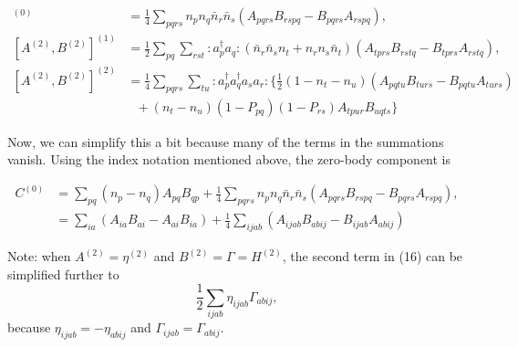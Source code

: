 \documentclass[12pt]{article}
\begin{document}
\begin{align}
[A^{(2)},B^{(2)}]^{(0)} &= \frac{1}{4} \sum_{pqrs} n_pn_q\bar{n}_r \bar{n}_s (A_{pqrs}B_{rspq}-B_{pqrs}A_{rspq}),\\
[A^{(2)},B^{(2)}]^{(1)} &= \frac{1}{2} \sum_{pq}\sum_{rst} :a_p^\dagger a_q: (\bar{n}_r \bar{n}_s n_t + n_r n_s \bar{n}_t) (A_{tprs}B_{rstq}-B_{tprs}A_{rstq}),\\
[A^{(2)},B^{(2)}]^{(2)} &= \frac{1}{4} \sum_{pqrs}\sum_{tu} :a_p^\dagger a_q^\dagger a_s a_r : \Big\{ \frac{1}{2}(1-n_t-n_u) (A_{pqtu}B_{turs}-B_{pqtu}A_{turs})  \\ &\ \ \  +  (n_t-n_u)(1-P_{pq})(1-P_{rs})A_{tpur}B_{uqts} \Big\}
\end{align}

\noindent Now, we can simplify this a bit because many of the terms in the summations vanish. Using the index notation mentioned above, the zero-body component is

\begin{align}
C^{(0)} &= \sum_{pq}(n_p-n_q)A_{pq}B_{qp} + \frac{1}{4} \sum_{pqrs} n_pn_q\bar{n}_r \bar{n}_s (A_{pqrs}B_{rspq}-B_{pqrs}A_{rspq}),\\
&= \sum_{ia}(A_{ia}B_{ai}-A_{ai}B_{ia}) + \frac{1}{4} \sum_{ijab} (A_{ijab}B_{abij}-B_{ijab}A_{abij})
\end{align}

\noindent Note: when $A^{(2)}=\eta^{(2)}$ and $B^{(2)}=\Gamma=H^{(2)}$, the second term in (16) can be simplified further to
\begin{equation}
\frac{1}{2}\sum_{ijab} \eta_{ijab}\Gamma_{abij},
\end{equation}
because $\eta_{ijab}=-\eta_{abij}$ and $\Gamma_{ijab}=\Gamma_{abij}$.\\
\end{document}
